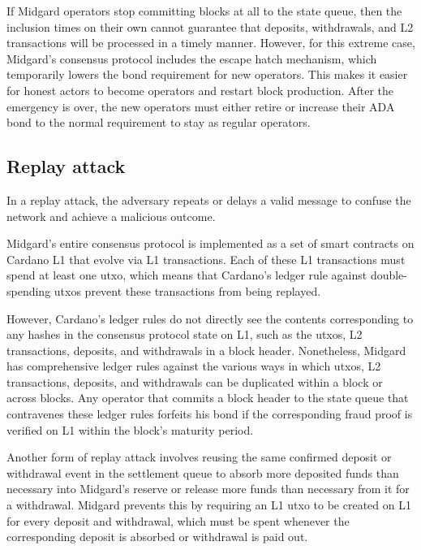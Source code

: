 \documentclass[../midgard.tex]{subfiles}
\begin{document}
If Midgard operators stop committing blocks at all to the state queue, then the inclusion times on their own cannot guarantee that deposits, withdrawals, and L2 transactions will be processed in a timely manner.
However, for this extreme case, Midgard's consensus protocol includes the escape hatch mechanism, which temporarily lowers the bond requirement for new operators.
This makes it easier for honest actors to become operators and restart block production.
After the emergency is over, the new operators must either retire or increase their ADA bond to the normal requirement to stay as regular operators.

\subsection{Replay attack}
\label{h:replay-attack}

In a replay attack, the adversary repeats or delays a valid message to confuse the network and achieve a malicious outcome.

Midgard's entire consensus protocol is implemented as a set of smart contracts on Cardano L1 that evolve via L1 transactions.
Each of these L1 transactions must spend at least one utxo, which means that Cardano's ledger rule against double-spending utxos prevent these transactions from being replayed.

However, Cardano's ledger rules do not directly see the contents corresponding to any hashes in the consensus protocol state on L1, such as the utxos, L2 transactions, deposits, and withdrawals in a block header.
Nonetheless, Midgard has comprehensive ledger rules against the various ways in which utxos, L2 transactions, deposits, and withdrawals can be duplicated within a block or across blocks.
Any operator that commits a block header to the state queue that contravenes these ledger rules forfeits his bond if the corresponding fraud proof is verified on L1 within the block's maturity period.

Another form of replay attack involves reusing the same confirmed deposit or withdrawal event in the settlement queue to absorb more deposited funds than necessary into Midgard's reserve or release more funds than necessary from it for a withdrawal.
Midgard prevents this by requiring an L1 utxo to be created on L1 for every deposit and withdrawal, which must be spent whenever the corresponding deposit is absorbed or withdrawal is paid out.
\end{document}
